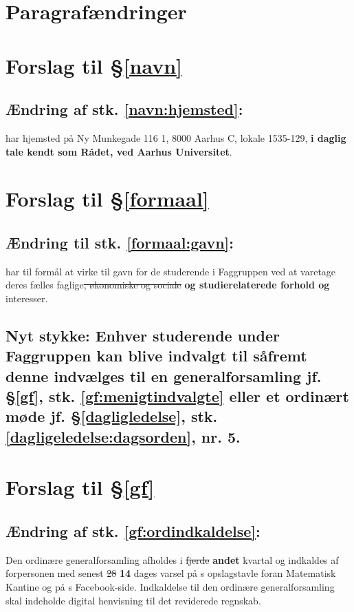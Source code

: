 \section*{Paragrafændringer}

\section*{Forslag til §\ref{navn}}

\subsection*{Ændring af stk. \ref{navn:hjemsted}:}

\fagr{} har hjemsted på Ny Munkegade 116 1, 8000 Aarhus C, lokale 1535-129, \textbf{i daglig tale kendt som Rådet, ved Aarhus Universitet}.

\section*{Forslag til §\ref{formaal}}

\subsection*{Ændring til stk. \ref{formaal:gavn}:}

\fagr{} har til formål at virke til gavn for de studerende i Faggruppen ved at varetage deres fælles faglige\st{, økonomiske og sociale} \textbf{og studierelaterede forhold og} interesser.

\subsection*{Nyt stykke: Enhver studerende under Faggruppen kan blive indvalgt til \fagr{} såfremt denne indvælges til en generalforsamling jf. §\ref{gf}, stk. \ref{gf:menigtindvalgte} eller et ordinært møde jf. §\ref{dagligledelse}, stk. \ref{dagligeledelse:dagsorden}, nr. 5.}

\section*{Forslag til §\ref{gf}}

\subsection*{Ændring af stk. \ref{gf:ordindkaldelse}:}

Den ordinære generalforsamling afholdes i \st{fjerde} \textbf{andet} kvartal og indkaldes af forpersonen med senest \st{28} \textbf{14} dages varsel på \fagr{}s opslagstavle foran Matematisk Kantine og på \fagr{}s Facebook-side. Indkaldelse til den ordinære generalforsamling skal indeholde digital henvisning til det reviderede regnskab.

